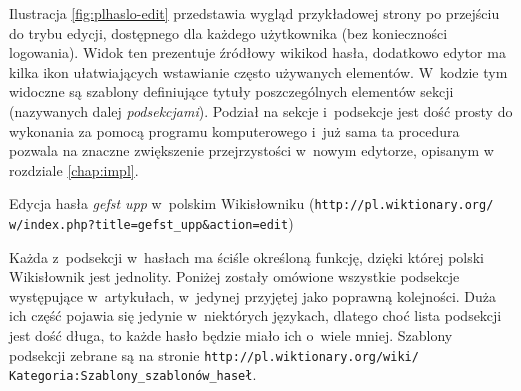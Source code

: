 \documentclass{pracamgr}
\begin{document}
Ilustracja \ref{fig:plhaslo-edit} przedstawia wygląd przykładowej strony po przejściu do trybu edycji, dostępnego dla każdego użytkownika (bez konieczności logowania). Widok ten prezentuje źródłowy wikikod hasła, dodatkowo edytor ma kilka ikon ułatwiających wstawianie często używanych elementów. W~kodzie tym widoczne są szablony definiujące tytuły poszczególnych elementów sekcji (nazywanych dalej \emph{podsekcjami}). Podział na sekcje i~podsekcje jest dość prosty do wykonania za pomocą programu komputerowego i~już sama ta procedura pozwala na znaczne zwiększenie przejrzystości w~nowym edytorze, opisanym w rozdziale \ref{chap:impl}.

\begin{illustration}
	\caption{Edycja hasła \emph{gefst upp} w~polskim Wikisłowniku (\texttt{http://pl.wiktionary.org/ w/index.php?title=gefst\_upp\&action=edit})}
	\label{fig:plhaslo-edit}
\end{illustration}

Każda z~podsekcji w~hasłach ma ściśle określoną funkcję, dzięki której polski Wikisłownik jest jednolity. Poniżej zostały omówione wszystkie podsekcje występujące w~artykułach, w~jedynej przyjętej jako poprawną kolejności. Duża ich część pojawia się jedynie w~niektórych językach, dlatego choć lista podsekcji jest dość długa, to każde hasło będzie miało ich o~wiele mniej. Szablony podsekcji zebrane są na stronie \texttt{http://pl.wiktionary.org/wiki/ Kategoria:Szablony\_szablonów\_haseł}.
\end{document}
